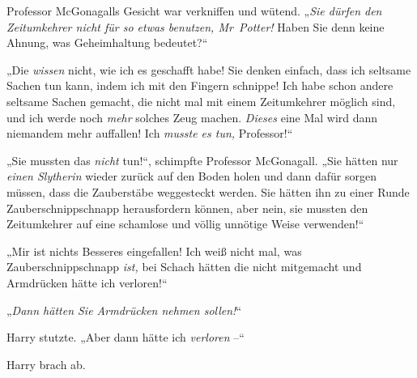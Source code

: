 Professor McGonagalls Gesicht war verkniffen und wütend. „\emph{Sie dürfen den Zeitumkehrer nicht für so etwas benutzen, Mr~Potter!} Haben Sie denn keine Ahnung, was Geheimhaltung bedeutet?“

„Die \emph{wissen} nicht, wie ich es geschafft habe! Sie denken einfach, dass ich seltsame Sachen tun kann, indem ich mit den Fingern schnippe! Ich habe schon andere seltsame Sachen gemacht, die nicht mal mit einem Zeitumkehrer möglich sind, und ich werde noch \emph{mehr} solches Zeug machen. \emph{Dieses} eine Mal wird dann niemandem mehr auffallen! Ich \emph{musste es tun,} Professor!“

„Sie mussten das \emph{nicht} tun!“, schimpfte Professor McGonagall. „Sie hätten nur \emph{einen Slytherin} wieder zurück auf den Boden holen und dann dafür sorgen müssen, dass die Zauberstäbe weggesteckt werden. Sie hätten ihn zu einer Runde Zauberschnippschnapp herausfordern können, aber nein, sie mussten den Zeitumkehrer auf eine schamlose und völlig unnötige Weise verwenden!“

„Mir ist nichts Besseres eingefallen! Ich weiß nicht mal, was Zauberschnippschnapp \emph{ist,} bei Schach hätten die nicht mitgemacht und Armdrücken hätte ich verloren!“

„\emph{Dann hätten Sie Armdrücken nehmen sollen!}“

Harry stutzte. „Aber dann hätte ich \emph{verloren} –“

Harry brach ab.

